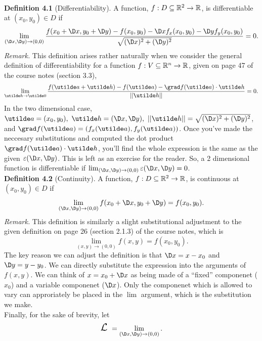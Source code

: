 \documentclass[a4paper, 11pt]{report}
\begin{document}
\newpage
{}
\sol \\
\textbf{Definition 4.1} (Differentiability). A function, $f:D\subseteq\mathbb{R}^2\to\mathbb{R}$, is differentiable at $(x_0, y_0)\in D$ if
$$
	\lim_{(\D x, \D y)\to(0,0)} 
	\frac{f(x_0 + \D x, y_0 + \D y) - f(x_0, y_0) - \D xf_x(x_0, y_0) - \D y f_y(x_0, y_0)}
		{\sqrt	{(\D x)^2 + (\D y)^2}}
	= 0.
$$
\textit{Remark.} This definition arises rather naturally when we consider the general definition of differentiability for a function $f:V\subseteq\mathbb{R}^n\to\mathbb{R}$, given on page 47 of the course notes (section 3.3),
$$
	\lim_{\ut{h}\to\ut{0}}
	\frac{f(\ut{a}+\ut{h})-f(\ut{a})-\grad f(\ut{a})\cd\ut{h}}
		{||\ut{h}||}
	= 0.
$$
In the two dimensional case, $\ut{a} = (x_0, y_0),\ \ut{h} = (\D x, \D y),\ ||\ut{h}|| = \sqrt{(\D x)^2 + (\D y)^2}$, and $\grad f(\ut{a}) = (f_x(\ut{a}), f_y(\ut{a}))$. Once you've made the neccesary substitutions and computed the dot product $\grad f(\ut{a})\cd\ut{h}$, you'll find the whole expression is the same as the given $\veps(\D x, \D y)$. This is left as an exercise for the reader. So, a 2 dimensional function is differentiable if $\lim_{(\D x, \D y)\to(0,0)}\veps(\D x, \D y)=0$.\\

\textbf{Definition 4.2} (Continuity). A function, $f:D\subseteq \mathbb{R}^2\to\mathbb{R}$, is continuous at $(x_0, y_0)\in D$ if 
$$
	\lim_{(\D x, \D y)\to(0,0)}f(x_0 + \D x, y_0 + \D y) = f(x_0, y_0).
$$
\textit{Remark.} This definition is similarly a slight substitutional adjustment to the given definition on page 26 (section 2.1.3) of the course notes, which is
$$
	\lim_{(x,y)\to(0,0)}f(x,y) = f(x_0, y_0).
$$
The key reason we can adjust the definition is that $\D x = x - x_0$ and $\D y = y - y_0$. We can directly substitute the expression into the arguments of $f(x,y)$. We can think of $x = x_0 + \D x$ as being made of a ``fixed'' componenet ($x_0$) and a variable componenet ($\D x$). Only the componenet which is allowed to vary can approriately be placed in the $\lim$ argument, which is the substitution we make. \\

Finally, for the sake of brevity, let 
$$
\text{\Large$\cll$}\ = \lim_{(\D x, \D y)\to(0,0)}.
$$
\end{document}

